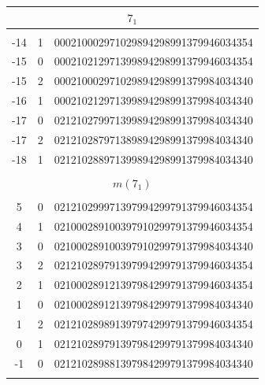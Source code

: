 \documentclass{article}
\begin{document}
\begin{supertabular}[h]{c c r}
\hline
{}                            \\
\hline\\[-3pt]
-14   & 1  & 000210002971029894298991379946034354  \\
-15   & 0  & 000210212971399894298991379946034354  \\
-15   & 2  & 000210002971029894298991379984034340  \\
-16   & 1  & 000210212971399894298991379984034340  \\
-17   & 0  & 021210279971399894298991379984034340  \\
-17   & 2  & 021210287971389894298991379984034340  \\
-18   & 1  & 021210288971399894298991379984034340  \\
\\[-5pt]

\hline
{}                         \\
\hline\\[-3pt]
5     & 0  & 021210299971397994299791379946034354  \\
4     & 1  & 021000289100397910299791379946034354  \\
3     & 0  & 021000289100397910299791379984034340  \\
3     & 2  & 021210289791397994299791379946034354  \\
2     & 1  & 021000289121397984299791379946034354  \\
1     & 0  & 021000289121397984299791379984034340  \\
1     & 2  & 021210289891397974299791379946034354  \\
0     & 1  & 021210289791397984299791379984034340  \\
-1    & 0  & 021210289881397984299791379984034340  \\
\\[-5pt]


\end{supertabular}
\end{document}

